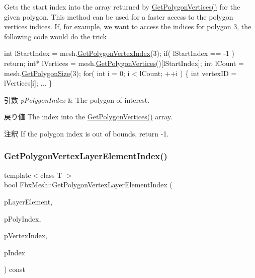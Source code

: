 Gets the start index into the array returned by \hyperlink{class_fbx_mesh_a0c29a17dfc1db3644772acb5c32a63b0}{Get\+Polygon\+Vertices()} for the given polygon. This method can be used for a faster access to the polygon vertices indices. If, for example, we want to access the indices for polygon 3, the following code would do the trick 
\begin{DoxyCode}
\textcolor{keywordtype}{int} lStartIndex = mesh.\hyperlink{class_fbx_mesh_a942e182a7c27fa11464b9adb0c9cdc3b}{GetPolygonVertexIndex}(3);
\textcolor{keywordflow}{if}( lStartIndex == -1 ) \textcolor{keywordflow}{return};
\textcolor{keywordtype}{int}* lVertices = mesh.\hyperlink{class_fbx_mesh_a0c29a17dfc1db3644772acb5c32a63b0}{GetPolygonVertices}()[lStartIndex];
\textcolor{keywordtype}{int} lCount = mesh.\hyperlink{class_fbx_mesh_a775d0e10dc67bbcb9f7368d828588e55}{GetPolygonSize}(3);
\textcolor{keywordflow}{for}( \textcolor{keywordtype}{int} i = 0; i < lCount; ++i )
\{
    \textcolor{keywordtype}{int} vertexID = lVertices[i];
    ...
\}
\end{DoxyCode}
 
\begin{DoxyParams}{引数}
{\em p\+Polygon\+Index} & The polygon of interest. \\
\hline
\end{DoxyParams}
\begin{DoxyReturn}{戻り値}
The index into the \hyperlink{class_fbx_mesh_a0c29a17dfc1db3644772acb5c32a63b0}{Get\+Polygon\+Vertices()} array. 
\end{DoxyReturn}
\begin{DoxyRemark}{注釈}
If the polygon index is out of bounds, return -\/1. 
\end{DoxyRemark}
\mbox{\label{class_fbx_mesh_a68a6816acf0eaacc995144b14a28c856}} 
\subsubsection{\texorpdfstring{Get\+Polygon\+Vertex\+Layer\+Element\+Index()}{GetPolygonVertexLayerElementIndex()}}
{\footnotesize\ttfamily template$<$class T $>$ \\
bool Fbx\+Mesh\+::\+Get\+Polygon\+Vertex\+Layer\+Element\+Index (\begin{DoxyParamCaption}\item[{const \hyperlink{class_fbx_layer_element_template}{Fbx\+Layer\+Element\+Template}$<$ T $>$ $\ast$}]{p\+Layer\+Element,  }\item[{int}]{p\+Poly\+Index,  }\item[{int}]{p\+Vertex\+Index,  }\item[{int \&}]{p\+Index }\end{DoxyParamCaption}) const\hspace{0.3cm}{\ttfamily [protected]}}

